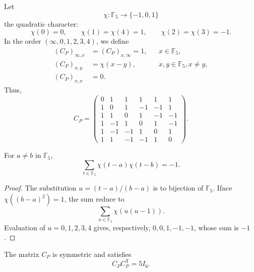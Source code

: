 Let
\[
 \chi:\mathbb F_5\longrightarrow\{-1,0,1\}
\]
the quadratic character:
\[
 \chi(0)=0,
 \qquad
 \chi(1)=\chi(4)=1,
 \qquad
 \chi(2)=\chi(3)=-1.
\]
In the order \((\infty,0,1,2,3,4)\), we define
\begin{align}
 (C_P)_{\infty,x}&=(C_P)_{x,\infty}=1,
 &&x\in\mathbb F_5,\label{p12-83-c20-s1:eq:paley-fila-infinito}\\
 (C_P)_{x,y}&=\chi(x-y),
 &&x,y\in\mathbb F_5, x\neq y,\label{p12-83-c20-s1:eq:paley-entradas-finitas}\\
 (C_P)_{x,x}&=0.
 \label{p12-83-c20-s1:eq:paley-diagonal}
\end{align}
Thus,
\begin{equation}
 C_P=
 \begin{pmatrix}
 0& 1& 1& 1& 1& 1\\
 1& 0& 1&-1&-1& 1\\
 1& 1& 0& 1&-1&-1\\
 1&-1& 1& 0& 1&-1\\
 1&-1&-1& 1& 0& 1\\
 1& 1&-1&-1& 1& 0
 \end{pmatrix}.
 \label{p12-83-c20-s1:eq:matriz-conferencia-paley-autonoma}
\end{equation}

\begin{lemma}
\label{p12-83-c20-s1:lem:correlacion-cuadratica-f5}
For \(a\neq b\) in \(\mathbb F_5\),
\begin{equation}
 \sum_{t\in\mathbb F_5}
 \chi(t-a)\chi(t-b)=-1.
 \label{p12-83-c20-s1:eq:correlacion-cuadratica-f5}
\end{equation}
\end{lemma}

\begin{proof}
The substitution \(u=(t-a)/(b-a)\) is to bijection of \(\mathbb F_5\).
Ifnce \(\chi((b-a)^2)=1\), the sum  reduce to
\[
 \sum_{u\in\mathbb F_5}\chi(u(u-1)).
\]
Evaluation of \(u=0,1,2,3,4\) gives, respectively,
\(0,0,1,-1,-1\), whose sum is \(-1\).
\end{proof}

\begin{proposition}
\label{p12-83-c20-s1:prop:paley-identidad-conferencia-autonoma}
The matrix \(C_P\) is symmetric and satisfies
\begin{equation}
 \boxed{C_PC_P^{\mathsf T}=5I_6.}
 \label{p12-83-c20-s1:eq:paley-identidad-conferencia-autonoma}
\end{equation}
\end{proposition}

